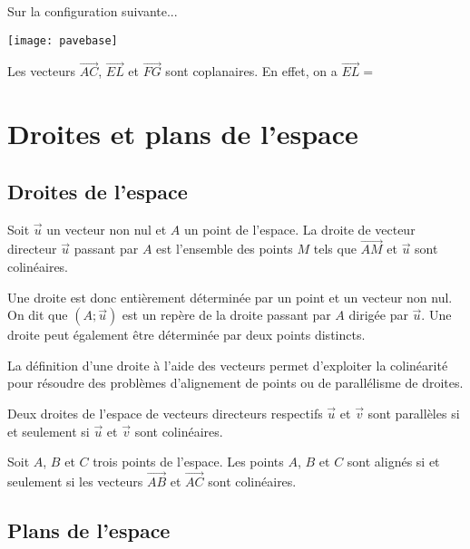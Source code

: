 \documentclass[11pt,fleqn, openany]{book} %
\begin{document}
\begin{example} Sur la configuration suivante...

\begin{center}
\texttt{[image: pavebase]}
\end{center}

Les vecteurs $\overrightarrow{AC}$, $\overrightarrow{EL}$ et $\overrightarrow{FG}$ sont coplanaires. En effet, on a $\overrightarrow{EL}=$\end{example}


\section{Droites et plans de l'espace}

\subsection{Droites de l'espace}


\begin{definition} Soit $\vec u$ un vecteur non nul et $A$ un point de l'espace. La droite de vecteur directeur $\vec u$ passant par $A$ est l'ensemble des points $M$ tels que $\overrightarrow{AM}$ et $\vec u$ sont colinéaires.\end{definition}

Une droite est donc entièrement déterminée par un point et un vecteur non nul. On dit que $(A ; \vec u)$ est un repère de la droite passant par $A$ dirigée par $\vec u$. Une droite peut également être déterminée par deux points distincts.

La définition d'une droite à l'aide des vecteurs permet d'exploiter la colinéarité pour résoudre des problèmes d'alignement de points ou de parallélisme de droites.

\begin{proposition}Deux droites de l'espace de vecteurs directeurs respectifs $\vec u$ et $\vec v$ sont parallèles si et seulement si $\vec u$ et $\vec v$ sont colinéaires.\end{proposition}

\begin{proposition}Soit $A$, $B$ et $C$ trois points de l'espace. Les points $A$, $B$ et $C$ sont alignés si et seulement si les vecteurs $\overrightarrow{AB}$ et $\overrightarrow{AC}$ sont colinéaires.\end{proposition}

\subsection{Plans de l'espace}
\end{document}
